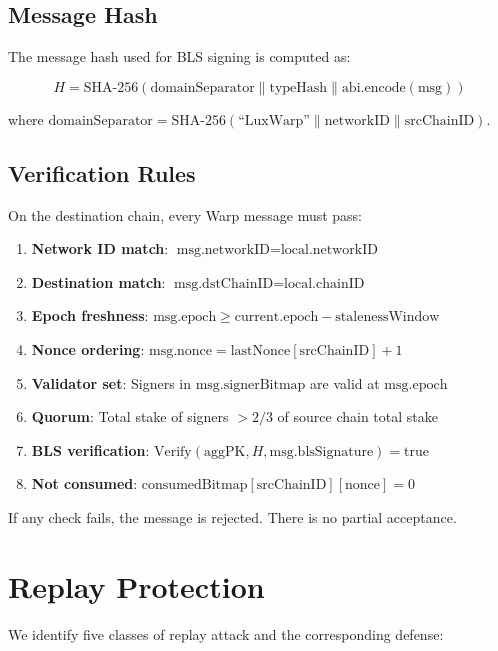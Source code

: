 \documentclass[11pt,a4paper]{article}
\begin{document}
\subsection{Message Hash}

The message hash used for BLS signing is computed as:

$$H = \text{SHA-256}(\text{domainSeparator} \| \text{typeHash} \| \text{abi.encode}(\text{msg}))$$

where $\text{domainSeparator} = \text{SHA-256}(\text{``LuxWarp''} \| \text{networkID} \| \text{srcChainID})$.

\subsection{Verification Rules}

On the destination chain, every Warp message must pass:

\begin{enumerate}[leftmargin=2em]
\item \textbf{Network ID match}: $\text{msg.networkID} = \text{local.networkID}$
\item \textbf{Destination match}: $\text{msg.dstChainID} = \text{local.chainID}$
\item \textbf{Epoch freshness}: $\text{msg.epoch} \geq \text{current.epoch} - \text{stalenessWindow}$
\item \textbf{Nonce ordering}: $\text{msg.nonce} = \text{lastNonce}[\text{srcChainID}] + 1$
\item \textbf{Validator set}: Signers in $\text{msg.signerBitmap}$ are valid at $\text{msg.epoch}$
\item \textbf{Quorum}: Total stake of signers $> 2/3$ of source chain total stake
\item \textbf{BLS verification}: $\text{Verify}(\text{aggPK}, H, \text{msg.blsSignature}) = \text{true}$
\item \textbf{Not consumed}: $\text{consumedBitmap}[\text{srcChainID}][\text{nonce}] = 0$
\end{enumerate}

If any check fails, the message is rejected. There is no partial acceptance.

\section{Replay Protection}\label{sec:replay}

We identify five classes of replay attack and the corresponding defense:
\end{document}
